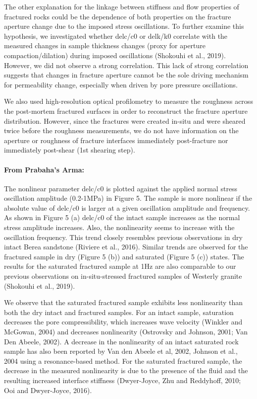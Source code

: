 \documentclass[letterpaper,10pt]{article}
\begin{document}
The other explanation for the linkage between stiffness and flow properties of fractured rocks could be the dependence of both properties on the fracture aperture change due to the imposed stress oscillations. To further examine this hypothesis, we investigated whether 
delc/c0 or delk/k0 correlate with the measured changes in sample thickness changes (proxy for aperture compaction/dilation) during imposed oscillations (Shokouhi et al., 2019). However, we did not observe a strong correlation. This lack of strong correlation suggests that changes in fracture aperture cannot be the sole driving mechanism for permeability change, especially when driven by pore pressure oscillations.  

We also used high-resolution optical profilometry to measure the roughness across the post-mortem fractured surfaces in order to reconstruct the fracture aperture distribution. However, since the fractures were created in-situ and were sheared twice before the roughness measurements, we do not have information on the aperture or roughness of fracture interfaces immediately post-fracture nor immediately post-shear (1st shearing step).  

\newpage
\paragraph{From Prabaha's Arma:}
The nonlinear parameter delc/c0 is plotted against the applied normal stress oscillation amplitude (0.2-1MPa) in Figure 5. The sample is more nonlinear if the absolute value of 
delc/c0 is larger at a given oscillation amplitude and frequency. As shown in Figure 5 (a) 
delc/c0 of the intact sample increases as the normal stress amplitude increases. Also, the nonlinearity seems to increase with the oscillation frequency. This trend closely resembles previous observations in dry intact Berea sandstone (Riviere et al., 2016). Similar trends are observed for the fractured sample in dry (Figure 5 (b)) and saturated (Figure 5 (c)) states. The results for the saturated fractured sample at 1Hz are also comparable to our previous observations on in-situ-stressed fractured samples of Westerly granite (Shokouhi et al., 2019).  

We observe that the saturated fractured sample exhibits less nonlinearity than both the dry intact and fractured samples. For an intact sample, saturation decreases the pore compressibility, which increases wave velocity (Winkler and McGowan, 2004) and decreases nonlinearity (Ostrovsky and Johnson, 2001; Van Den Abeele, 2002). A decrease in the nonlinearity of an intact saturated rock sample has also been reported by Van den Abeele et al, 2002, Johnson et al., 2004 using a resonance-based method. For  the saturated fractured sample, the decrease in the measured nonlinearity is due to the presence of the fluid and the resulting increased interface stiffness (Dwyer-Joyce, Zhu and Reddyhoff, 2010; Ooi and Dwyer-Joyce, 2016). 
\end{document}

